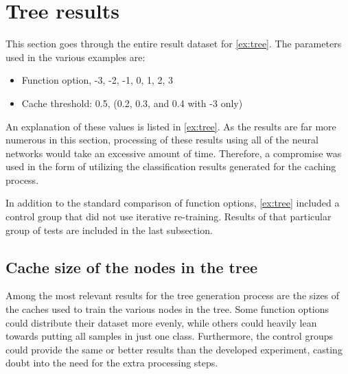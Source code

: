 \section{Tree results}
This section goes through the entire result dataset for \cref{ex:tree}.
The parameters used in the various examples are:

\begin{itemize}
    \item Function option, -3, -2, -1, 0, 1, 2, 3
    \item Cache threshold: 0.5, (0.2, 0.3, and 0.4 with -3 only)
\end{itemize}{}

An explanation of these values is listed in \cref{ex:tree}.
As the results are far more numerous in this section, processing of these results using all of the neural networks would take an excessive amount of time.
Therefore, a compromise was used in the form of utilizing the classification results generated for the caching process.

In addition to the standard comparison of function options, \cref{ex:tree} included a control group that did not use iterative re-training.
Results of that particular group of tests are included in the last subsection.

\subsection{Cache size of the nodes in the tree}
Among the most relevant results for the tree generation process are the sizes of the caches used to train the various nodes in the tree.
Some function options could distribute their dataset more evenly, while others could heavily lean towards putting all samples in just one class.
Furthermore, the control groups could provide the same or better results than the developed experiment, casting doubt into the need for the extra processing steps.

